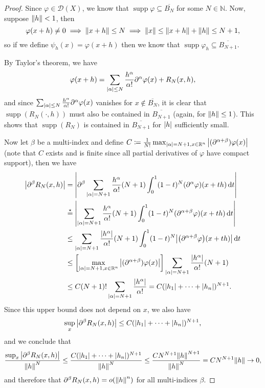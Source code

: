 \documentclass{article}
\theoremstyle{plain}
\theoremstyle{remark}
\renewcommand{\phi}{\varphi}
\newcommand{\Bb}{\mathbb}
\newcommand{\Cal}{\mathcal}
\newcommand{\NN}{\Bb N}
\newcommand{\RR}{\Bb R}
\newcommand{\DD}{\Cal D}
\newcommand\ceq\coloneqq %
\newcommand\pt\partial
\DeclareMathOperator{\supp}{supp}
\newcommand\clos\overline
\begin{document}
\begin{proof}
	Since $\phi \in \DD(X)$, we know that $\supp\phi \subseteq \clos{B_N}$ for some $N \in \NN$. Now, suppose $\norm{h} < 1$, then
	\[
	\phi(x+h) \neq 0 \implies \norm{x + h} \leq N \implies \norm{x} \leq \norm{x + h} + \norm{h} \leq N + 1, 
	\]
	so if we define $\psi_h(x) = \phi(x+h)$ then we know that $\supp\phi_h \subseteq \clos{B_{N+1}}$. 
	
	By Taylor's theorem, we have
	\[
	\phi(x+h) = \sum_{\abs{\alpha} \leq N} \frac{h^\alpha}{\alpha!} \pt^\alpha \phi(x) + R_N(x, h),  
	\]
	and since $\sum_{\abs{\alpha} \leq N} \frac{h^\alpha}{\alpha!} \pt^\alpha \phi(x)$ vanishes for $x \notin \clos{B_N}$, it is clear that $\supp(R_N(\cdot, h))$ must also be contained in $\clos{B_{N+1}}$ (again, for $\norm{h} \leq 1$). This shows that $\supp(R_N)$ is contained in $\clos{B_{N+1}}$ for $\abs{h}$ sufficiently small. 
	
	Now let $\beta$ be a multi-index and define $C \ceq \frac{1}{N!} \max_{\abs{\alpha} = N+1, x \in \RR^n} \abs{(\pt^{\alpha + \beta})\phi(x)}$ (note that $C$ exists and is finite since all partial derivatives of $\phi$ have compact support), then we have
	\begin{align*}
	\abs{\pt^\beta R_N(x, h)} &= \abs{\pt^\beta \sum_{\abs{\alpha} = N+1} \frac{h^\alpha}{\alpha!}(N+1)\int_0^1 (1-t)^N (\pt^\alpha\phi)(x + th)\dd{t}} \\
	&\overset\star= \abs{\sum_{\abs{\alpha} = N+1} \frac{h^\alpha}{\alpha!}(N+1) \int_0^1 (1-t)^N (\pt^{\alpha + \beta}\phi)(x + th)\dd{t}} \\
	&\leq \sum_{\abs{\alpha} = N+1} \frac{\abs{h^\alpha}}{\alpha!}(N+1) \int_0^1 (1-t)^N \abs{\qty(\pt^{\alpha + \beta}\phi)(x+th)} \dd{t} \\
	&\leq \qty[\max_{\abs{\alpha} = N+1, x \in \RR^n} \abs{(\pt^{\alpha + \beta})\phi(x)}] \sum_{\abs{\alpha} = N+1} \frac{\abs{h^\alpha}}{\alpha!} (N+1) \\
	&\leq C (N+1)! \sum_{\abs{\alpha}= N+1}\frac{\abs{h^\alpha}}{\alpha!} = C(\abs{h_1} + \dotsb + \abs{h_n})^{N+1}.
\end{align*}
Since this upper bound does not depend on $x$, we also have
\[
\sup_x \abs{\pt^\beta R_N(x, h)} \leq C(\abs{h_1} + \dotsb + \abs{h_n})^{N+1}, 
\]
and we conclude that
\[ 
\frac{\sup_x \abs{\pt^\beta R_N(x, h)}}{\norm{h}^N} \leq \frac{C(\abs{h_1} + \dotsb + \abs{h_n})^{N+1}}{\norm{h}^N} \leq \frac{C N^{N+1} \norm{h}^{N+1}}{\norm{h}^N} = CN^{N+1} \norm{h} \to 0, 
\]
and therefore that $\pt^\beta R_N(x, h) = o(\norm{h}^n)$ for all multi-indices $\beta$. 
\end{proof}
\end{document}

